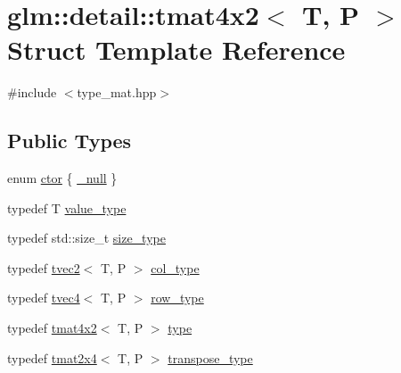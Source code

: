 \hypertarget{structglm_1_1detail_1_1tmat4x2}{}\section{glm\+:\+:detail\+:\+:tmat4x2$<$ T, P $>$ Struct Template Reference}
\label{structglm_1_1detail_1_1tmat4x2}


{\ttfamily \#include $<$type\+\_\+mat.\+hpp$>$}

\subsection*{Public Types}
\begin{DoxyCompactItemize}
\item 
enum \hyperlink{structglm_1_1detail_1_1tmat4x2_a4266befa296229458f2652dcc4ba4a72}{ctor} \{ \hyperlink{structglm_1_1detail_1_1tmat4x2_a4266befa296229458f2652dcc4ba4a72a75a9b723374baa541fbed868699bdd13}{\+\_\+null}
 \}
\item 
typedef T \hyperlink{structglm_1_1detail_1_1tmat4x2_a69ee68b76c63d5e19001223eb5e7e968}{value\+\_\+type}
\item 
typedef std\+::size\+\_\+t \hyperlink{structglm_1_1detail_1_1tmat4x2_aaf03e298b1377068358fc09cdfcd889a}{size\+\_\+type}
\item 
typedef \hyperlink{structglm_1_1detail_1_1tvec2}{tvec2}$<$ T, P $>$ \hyperlink{structglm_1_1detail_1_1tmat4x2_a7ff0997d9fa4f93eba8a6530ca2cd3f7}{col\+\_\+type}
\item 
typedef \hyperlink{structglm_1_1detail_1_1tvec4}{tvec4}$<$ T, P $>$ \hyperlink{structglm_1_1detail_1_1tmat4x2_a7800d3c9fae6e2e47ba71cac323aafcf}{row\+\_\+type}
\item 
typedef \hyperlink{structglm_1_1detail_1_1tmat4x2}{tmat4x2}$<$ T, P $>$ \hyperlink{structglm_1_1detail_1_1tmat4x2_a0906a5a3d185ed08196fd6657436eb56}{type}
\item 
typedef \hyperlink{structglm_1_1detail_1_1tmat2x4}{tmat2x4}$<$ T, P $>$ \hyperlink{structglm_1_1detail_1_1tmat4x2_a2093723021c90d6591afa09a5c8a0bdf}{transpose\+\_\+type}
\end{DoxyCompactItemize}
